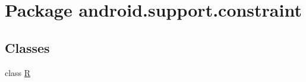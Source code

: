 \hypertarget{namespaceandroid_1_1support_1_1constraint}{}\section{Package android.\+support.\+constraint}
\label{namespaceandroid_1_1support_1_1constraint}
\subsection*{Classes}
\begin{DoxyCompactItemize}
\item 
class \mbox{\hyperlink{classandroid_1_1support_1_1constraint_1_1_r}{R}}
\end{DoxyCompactItemize}
